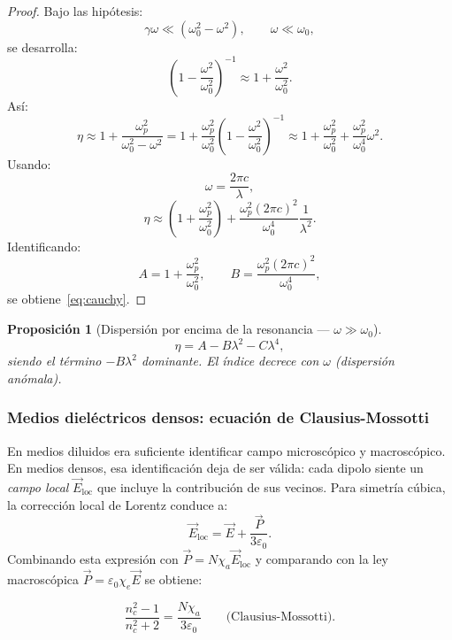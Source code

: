 \documentclass[12pt, a4paper]{article}
\theoremstyle{plain}
\newtheorem{proposicion}[teorema]{Proposición}
\theoremstyle{definition}
\theoremstyle{remark}
\newcommand{\ve}[1]{\vec{#1}}
\begin{document}
\begin{proof}
Bajo las hipótesis:
\[
  \gamma\omega\ll(\omega_0^2-\omega^2),
  \qquad
  \omega\ll\omega_0,
\]
se desarrolla:
\[
  \left(1-\frac{\omega^2}{\omega_0^2}\right)^{-1}
  \approx
  1+\frac{\omega^2}{\omega_0^2}.
\]
Así:
\[
  \eta \approx 1 + \frac{\omega_p^2}{\omega_0^2-\omega^2}
  = 1 + \frac{\omega_p^2}{\omega_0^2}
      \left(1-\frac{\omega^2}{\omega_0^2}\right)^{-1}
  \approx
  1+\frac{\omega_p^2}{\omega_0^2}
  +\frac{\omega_p^2}{\omega_0^4}\omega^2.
\]
Usando:
\[
  \omega=\frac{2\pi c}{\lambda},
\]
\[
  \eta \approx
  \left(1+\frac{\omega_p^2}{\omega_0^2}\right)
  +\frac{\omega_p^2(2\pi c)^2}{\omega_0^4}\frac{1}{\lambda^2}.
\]
Identificando:
\[
  A=1+\frac{\omega_p^2}{\omega_0^2},
  \qquad
  B=\frac{\omega_p^2(2\pi c)^2}{\omega_0^4},
\]
se obtiene~\eqref{eq:cauchy}.
\end{proof}

\begin{proposicion}[Dispersión por encima de la resonancia — $\omega\gg\omega_0$]
\begin{equation}
  \eta = A - B\lambda^2 - C\lambda^4, \label{eq:cauchy_alta}
\end{equation}
siendo el término $-B\lambda^2$ dominante. El índice decrece con $\omega$
(dispersión anómala).
\end{proposicion}

\subsubsection{Medios dieléctricos densos: ecuación de Clausius-Mossotti}

En medios diluidos era suficiente identificar campo microscópico y
macroscópico. En medios densos, esa identificación deja de ser válida:
cada dipolo siente un \emph{campo local} $\ve{E}_{\text{loc}}$ que incluye la
contribución de sus vecinos. Para simetría cúbica, la corrección local de
Lorentz conduce a:
\[
  \ve{E}_\text{loc} = \ve{E} + \frac{\ve{P}}{3\varepsilon_0}.
\]
Combinando esta expresión con $\ve{P}=N\chi_a\ve{E}_{\text{loc}}$ y comparando
con la ley macroscópica $\ve{P}=\varepsilon_0\chi_e\ve{E}$ se obtiene:

\begin{mdframed}[style=resultado]
\begin{equation}
  \frac{n_c^2 - 1}{n_c^2 + 2} = \frac{N\chi_a}{3\varepsilon_0}
  \qquad\text{(Clausius-Mossotti).} \label{eq:clausius}
\end{equation}
\end{mdframed}
\end{document}
